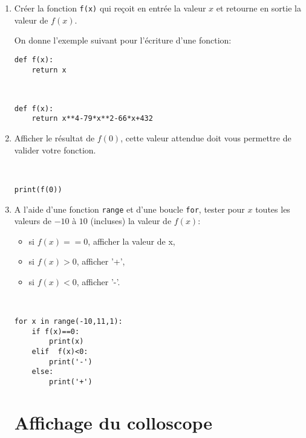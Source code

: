 \begin{enumerate}
\item Créer la fonction \verb?f(x)? qui reçoit en entrée la valeur $x$ et retourne en sortie la valeur de $f(x)$.

On donne l'exemple suivant pour l'écriture d'une fonction:

\begin{verbatim}
def f(x):
    return x
\end{verbatim}

\begin{solution}~\ \\
\begin{verbatim}
def f(x):
    return x**4-79*x**2-66*x+432
\end{verbatim}
\end{solution}

\item Afficher le résultat de $f(0)$, cette valeur attendue doit vous permettre de valider votre fonction.

\begin{solution}~\ \\
\begin{verbatim}
print(f(0))
\end{verbatim}
\end{solution}

\item A l'aide d'une fonction \verb?range? et d'une boucle \verb?for?, tester pour $x$ toutes les valeurs de $-10$ à $10$ (incluses) la valeur de $f(x)$:
\begin{itemize}
 \item si $f(x)==0$, afficher la valeur de x,
 \item si $f(x)>0$, afficher '+',
 \item si $f(x)<0$, afficher '-'.
\end{itemize}

\begin{solution}~\ \\
\begin{verbatim}
for x in range(-10,11,1):
    if f(x)==0:
        print(x)
    elif  f(x)<0:
        print('-')
    else:
        print('+')
\end{verbatim}
\end{solution}

\section*{Affichage du colloscope}


\end{enumerate}
